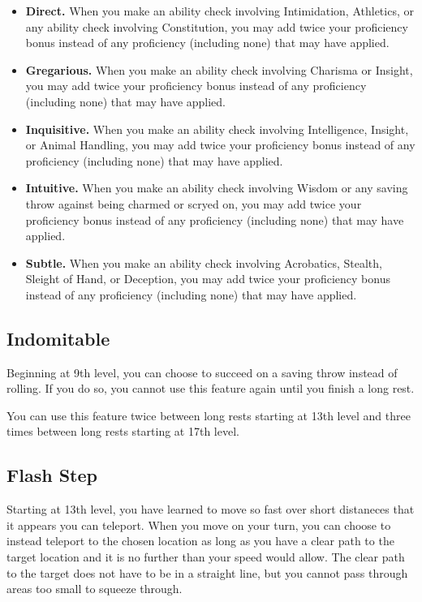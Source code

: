 \begin{itemize}
	\item \textbf{Direct.} When you make an ability check involving Intimidation, Athletics, or any ability check involving Constitution, you may add twice your proficiency bonus instead of any proficiency (including none) that may have applied.
	\item \textbf{Gregarious.} When you make an ability check involving Charisma or Insight, you may add twice your proficiency bonus instead of any proficiency (including none) that may have applied.
	\item \textbf{Inquisitive.} When you make an ability check involving Intelligence, Insight, or Animal Handling, you may add twice your proficiency bonus instead of any proficiency (including none) that may have applied.
	\item \textbf{Intuitive.} When you make an ability check involving Wisdom or any saving throw against being charmed or scryed on, you may add twice your proficiency bonus instead of any proficiency (including none) that may have applied.
	\item \textbf{Subtle.} When you make an ability check involving Acrobatics, Stealth, Sleight of Hand, or Deception, you may add twice your proficiency bonus instead of any proficiency (including none) that may have applied.
\end{itemize}

\subsection{Indomitable}

Beginning at 9th level, you can choose to succeed on a saving throw instead of rolling. If you do so, you cannot use this feature again until you finish a long rest.

You can use this feature twice between long rests starting at 13th level and three times between long rests starting at 17th level.

\subsection{Flash Step}
Starting at 13th level, you have learned to move so fast over short distaneces that it appears you can teleport. When you move on your turn, you can choose to instead teleport to the chosen location as long as you have a clear path to the target location and it is no further than your speed would allow. The clear path to the target does not have to be in a straight line, but you cannot pass through areas too small to squeeze through.

